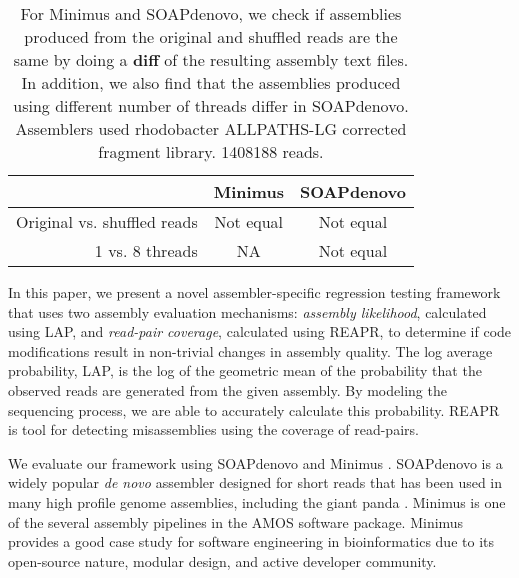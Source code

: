 \renewcommand{\baselinestretch}{1}
\small\normalsize


\begin{table}[h]
\caption{For Minimus and SOAPdenovo, we check if assemblies produced from the original and shuffled reads are the same by doing a \textbf{diff} of the resulting assembly text files.  In addition, we also find that the assemblies produced using different number of threads differ in SOAPdenovo.  Assemblers used rhodobacter ALLPATHS-LG corrected fragment library. 1408188 reads.}
\label{Tab:01}
\begin{tabular}{r|cc}
& Minimus & SOAPdenovo \\ \hline
Original vs. shuffled reads & Not equal & Not equal \\
1 vs. 8 threads & NA & Not equal \\ \hline
\end{tabular}
\end{table}
\fi
\renewcommand{\baselinestretch}{2}
\small\normalsize


In this paper, we present a novel assembler-specific regression testing
framework that uses two assembly evaluation mechanisms: \emph{assembly likelihood}, calculated using LAP\cite{LAP}, and \emph{read-pair coverage}, calculated using REAPR\cite{hunt2013reapr}, to determine if code modifications result in non-trivial
changes in assembly quality. The log average probability, LAP, is
the log of the geometric mean of the probability that the observed reads are generated from the given assembly.
By modeling the sequencing process, we are able to accurately calculate this probability. REAPR is
tool for detecting misassemblies using the coverage of read-pairs.

We evaluate our framework using SOAPdenovo \cite{li2010novo} and Minimus \cite{sommer2007minimus}.
SOAPdenovo is a widely popular \emph{de novo} assembler designed for short reads that has been used in many high profile genome assemblies, including the giant panda \cite{li2009sequence}.
Minimus is one of the several assembly pipelines in the AMOS software package.
Minimus provides a good case study for software engineering in bioinformatics due to its open-source nature, modular design, and active developer community.

